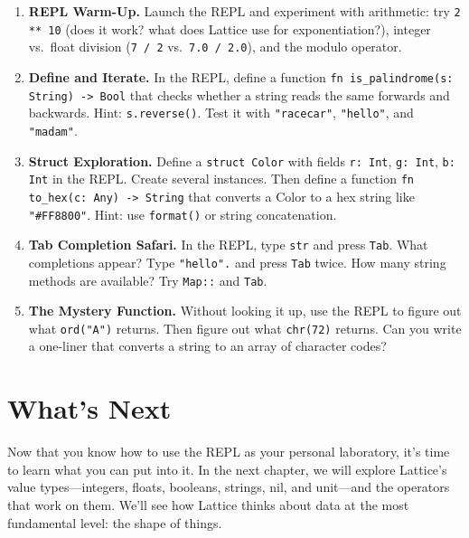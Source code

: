 \begin{enumerate}
  \item \textbf{REPL Warm-Up.}
  Launch the REPL and experiment with arithmetic: try \lstinline|2 ** 10| (does it work? what does Lattice use for exponentiation?), integer vs.\ float division (\lstinline|7 / 2| vs.\ \lstinline|7.0 / 2.0|), and the modulo operator.

  \item \textbf{Define and Iterate.}
  In the REPL, define a function \lstinline|fn is_palindrome(s: String) -> Bool| that checks whether a string reads the same forwards and backwards.
  Hint: \lstinline|s.reverse()|.
  Test it with \lstinline|"racecar"|, \lstinline|"hello"|, and \lstinline|"madam"|.

  \item \textbf{Struct Exploration.}
  Define a \lstinline|struct Color| with fields \lstinline|r: Int|, \lstinline|g: Int|, \lstinline|b: Int| in the REPL\@.
  Create several instances.
  Then define a function \lstinline|fn to_hex(c: Any) -> String| that converts a Color to a hex string like \lstinline|"#FF8800"|.
  Hint: use \lstinline|format()| or string concatenation.

  \item \textbf{Tab Completion Safari.}
  In the REPL, type \lstinline|str| and press \texttt{Tab}.
  What completions appear?
  Type \lstinline|"hello".| and press \texttt{Tab} twice.
  How many string methods are available?
  Try \lstinline|Map::| and \texttt{Tab}.

  \item \textbf{The Mystery Function.}
  Without looking it up, use the REPL to figure out what \lstinline|ord("A")| returns.
  Then figure out what \lstinline|chr(72)| returns.
  Can you write a one-liner that converts a string to an array of character codes?
\end{enumerate}

\section*{What's Next}\label{sec:ch02-whats-next}

Now that you know how to use the REPL as your personal laboratory, it's time to learn what you can put into it.
In the next chapter, we will explore Lattice's value types---integers, floats, booleans, strings, nil, and unit---and the operators that work on them.
We'll see how Lattice thinks about data at the most fundamental level: the shape of things.
